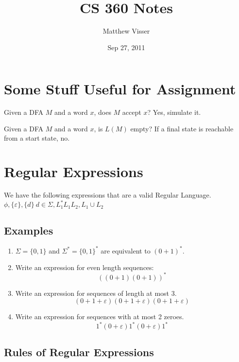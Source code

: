 \documentclass[12pt]{article}
\begin{document}
\title{CS 360 Notes}
\author{Matthew Visser}
\date{Sep 27, 2011}
\maketitle

\section{Some Stuff Useful for Assignment}

Given a DFA $M$ and a word $x$, does $M$ accept $x$? Yes, simulate it.

Given a DFA $M$ and a word $x$, is $L(M)$ empty? If a final state is reachable
from a start state, no.

\section{Regular Expressions}

We have the following expressions that are a valid Regular Language.
$\phi,  \{\varepsilon\},\{d\}\ d \in \Sigma, L_1^* L_1L_2, L_1 \cup L_2$

\subsection{Examples}

\begin{enumerate}
    \item  $\Sigma = \{0,1\}$ and $\Sigma^* = \{0,1\}^*$ are equivalent to $(0 + 1)^*$.

    \item Write an expression for even length sequences:
        \[
        ( (0 + 1)(0 + 1))^*
        \]

    \item Write an expression for sequences of length at most 3.
        \[
        (0 + 1 + \varepsilon)
        (0 + 1 + \varepsilon)
        (0 + 1 + \varepsilon)
        \]

    \item Write an expression for sequences with at most 2 zeroes.
        \[
        1^*(0 + \varepsilon)1^*(0 + \varepsilon)1^*
        \]

\end{enumerate}

\subsection{Rules of Regular Expressions}
\end{document}
